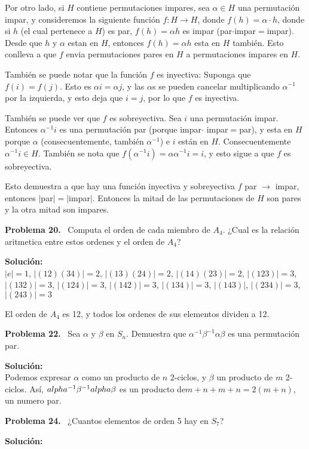 \documentclass{article}
\newcounter{problem}
\newcounter{solution}
\newcommand\Problem[1]{%
  \stepcounter{problem}%
  \textbf{Problema #1.}~%
  \setcounter{solution}{0}%
}
\newcommand\TheSolution{%
  \textbf{Solución:}\\%
}
\begin{document}
Por otro lado, si $H$ contiene permutaciones impares, sea $\alpha \in H$ una
permutación impar, y consideremos la siguiente función $f: H \rightarrow
H$, donde $f(h) = \alpha \cdot h$, donde si $h$ (el cual pertenece a $H$) es
par, $f(h) = \alpha h$ es impar (par$\cdot$impar$=$impar). Desde que $h$ y
$\alpha$ estan en $H$, entonces $f(h)=\alpha h$ esta en $H$ también. Esto
conlleva a que $f$ envia permutaciones pares en $H$ a permutaciones impares
en $H$.

Tambi\'en se puede notar que la funci\'on $f$ es inyectiva: Suponga que
$f(i) = f(j)$. Esto es $\alpha i = \alpha j$, y las $\alpha$s se pueden
cancelar multiplicando $\alpha^{-1}$ por la izquierda, y esto deja que $i=j$,
por lo que $f$ es inyectiva.

También se puede ver que $f$ es sobreyectiva. Sea $i$ una permutación
impar. Entonces $\alpha^{-1}i$ es una permutación par (porque impar$\cdot$
impar$=$par), y esta en $H$ porque $\alpha$ (consecuentemente, también $\alpha
^{-1}$) e $i$ están en $H$. Consecuentemente $\alpha^{-1}i \in H$. También
se nota que $f(\alpha^{-1}i) = \alpha\alpha^{-1}i = i$, y esto sigue a que $f$
es sobreyectiva.

Esto demuestra a que hay una función inyectiva y sobreyectiva $f$ par
$\rightarrow $ impar, entonces $|$par$|=|$impar$|$. Entonces la mitad de las
permutaciones de $H$ son pares y la otra mitad son impares.

\Problem{20} Computa el orden de cada miembro de $A_4$. ¿Cual es la relación
aritmetica entre estos ordenes y el orden de $A_4$?

\TheSolution{}
$|e| = 1$, $|(12)(34)| = 2$, $|(13)(24)| = 2$, $|(14)(23)| = 2$, $|(123)| = 
3$, $|(132)| = 3$, $|(124)| = 3$, $|(142)| = 3$, $|(134)| = 3$, $|(143)|$,
$|(234)| = 3$, $|(243)| = 3$

El orden de $A_4$ es 12, y todos los ordenes de sus elementos dividen a 12.

\Problem{22} Sea $\alpha$ y $\beta$ en $S_n$. Demuestra que $\alpha^{-1}\beta
^{-1}\alpha\beta$ es una permutación par.

\TheSolution{} Podemos expresar $\alpha$ como un producto de $n$ 2-ciclos, y
$\beta$ un producto de $m$ 2-ciclos. Así, $\\alpha^{-1}\beta^{-1}alpha\beta$
es un producto de$m + n + m + n = 2(m + n)$, un numero par.

\Problem{24} ¿Cuantos elementos de orden 5 hay en $S_7$?

\TheSolution{}
\end{document}
